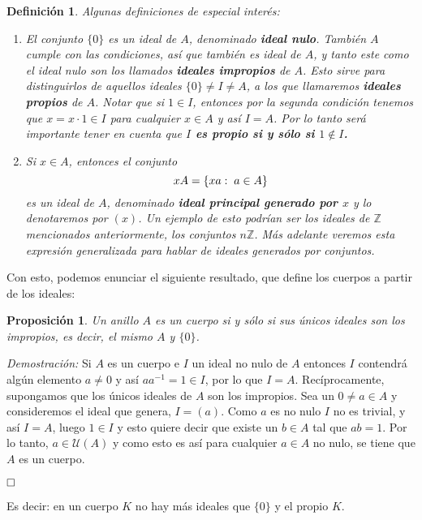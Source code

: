 \documentclass[12pt]{article}
\newtheorem{proposition}[theorem]{Proposición}
\newtheorem{definition}[theorem]{Definición}
\begin{document}
\begin{definition} Algunas definiciones de especial interés: \renewcommand{\labelenumi}{\arabic{enumi}.} \begin{enumerate}
\item El conjunto $\lbrace 0 \rbrace$ es un ideal de $A$, denominado \textbf{ideal nulo}. También $A$ cumple con las condiciones, así que también es ideal de $A$, y tanto este como el ideal nulo son los llamados \textbf{ideales impropios} de $A$. Esto sirve para distinguirlos de aquellos ideales $\lbrace 0 \rbrace \neq I \neq A$, a los que llamaremos \textbf{ideales propios} de $A$. Notar que si $1 \in I$, entonces por la segunda condición tenemos que $x = x \cdot 1 \in I$ para cualquier $x \in A$ y así $I = A$. Por lo tanto será importante tener en cuenta que \textbf{$I$ es propio si y sólo si $1 \notin I$.}
\item Si $x \in A$, entonces el conjunto $$xA = \lbrace xa : \hspace{0.1cm} a \in A \rbrace$$ es un ideal de $A$, denominado \textbf{ideal principal generado por $x$} y lo denotaremos por $(x)$. Un ejemplo de esto podrían ser los ideales de $\mathbb{Z}$ mencionados anteriormente, los conjuntos $n\mathbb{Z}$. Más adelante veremos esta expresión generalizada para hablar de ideales generados por conjuntos.
\end{enumerate}
\end{definition}

Con esto, podemos enunciar el siguiente resultado, que define los cuerpos a partir de los ideales:

\begin{proposition}\label{eq:idK}Un anillo $A$ es un cuerpo si y sólo si sus únicos ideales son los impropios, es decir, el mismo $A$ y $\lbrace 0 \rbrace$.
\end{proposition}
\emph{Demostración: } Si $A$ es un cuerpo e $I$ un ideal no nulo de $A$ entonces $I$ contendrá algún elemento $a \neq 0$ y así $aa^{-1} = 1 \in I$, por lo que $I = A$. Recíprocamente, supongamos que los únicos ideales de $A$ son los impropios. Sea un $0 \neq a \in A$ y consideremos el ideal que genera, $I=(a)$. Como $a$ es no nulo $I$ no es trivial, y así $I=A$, luego $1 \in I$ y esto quiere decir que existe un $b \in A$ tal que $ab = 1$. Por lo tanto, $a \in \mathcal{U}(A)$ y como esto es así para cualquier $a \in A$ no nulo, se tiene que $A$ es un cuerpo.

$\hfill \square$

Es decir: en un cuerpo $K$ no hay más ideales que $\lbrace 0 \rbrace$ y el propio $K$. 
\end{document}
